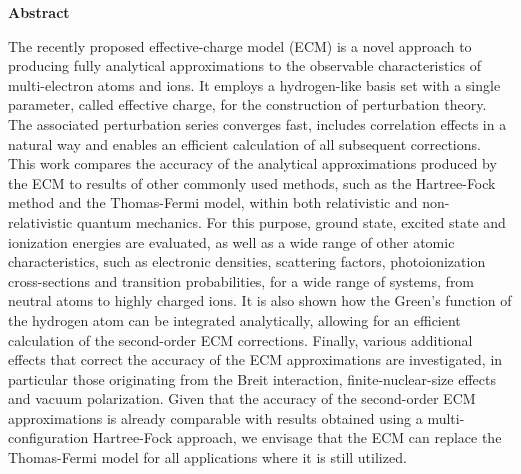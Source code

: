 {\small
  \begin{center}
    \textbf{Abstract}
  \end{center}

  \noindent The recently proposed effective-charge model (ECM) is a novel approach to producing fully analytical approximations to the observable characteristics of multi-electron atoms and ions. It employs a hydrogen-like basis set with a single parameter, called effective charge, for the construction of perturbation theory. The associated perturbation series converges fast, includes correlation effects in a natural way and enables an efficient calculation of all subsequent corrections. This work compares the accuracy of the analytical approximations produced by the ECM to results of other commonly used methods, such as the Hartree-Fock method and the Thomas-Fermi model, within both relativistic and non-relativistic quantum mechanics. For this purpose, ground state, excited state and ionization energies are evaluated, as well as a wide range of other atomic characteristics, such as electronic densities, scattering factors, photoionization cross-sections and transition probabilities, for a wide range of systems, from neutral atoms to highly charged ions. It is also shown how the Green's function of the hydrogen atom can be integrated analytically, allowing for an efficient calculation of the second-order ECM corrections. Finally, various additional effects that correct the accuracy of the ECM approximations are investigated, in particular those originating from the Breit interaction, finite-nuclear-size effects and vacuum polarization. Given that the accuracy of the second-order ECM approximations is already comparable with results obtained using a multi-configuration Hartree-Fock approach, we envisage that the ECM can replace the Thomas-Fermi model for all applications where it is still utilized.}

